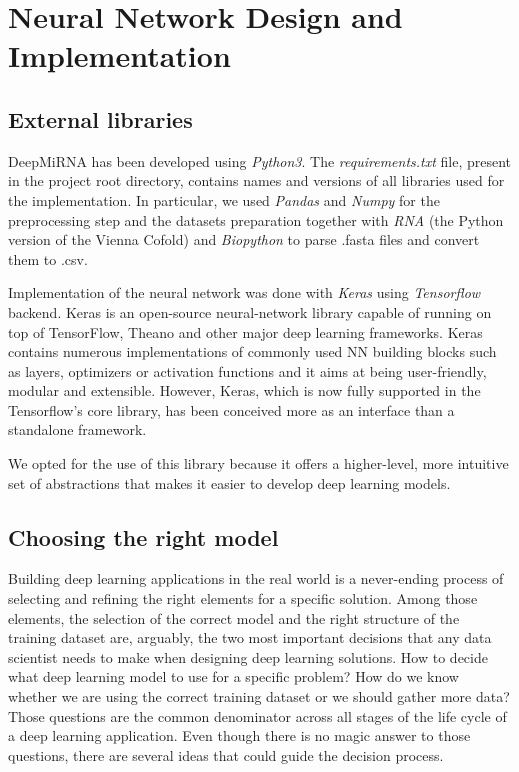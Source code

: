 
\chapter{Neural Network Design and Implementation} %

\label{Chapter5} %

\section{External libraries}
DeepMiRNA has been developed using \emph{Python3}. The \emph{requirements.txt} file, present in the project root directory, contains names and versions of all libraries used for the implementation. In particular, we used \emph{Pandas} and \emph{Numpy} for the preprocessing step and the datasets preparation together with \emph{RNA} (the Python version of the Vienna Cofold) and \emph{Biopython} to parse .fasta files and convert them to .csv. 

Implementation of the neural network was done with \emph{Keras}\cite{keras} using \emph{Tensorflow} backend\cite{tensorflow}. Keras is an open-source neural-network library capable of running on top of TensorFlow, Theano and other major deep learning frameworks. Keras contains numerous implementations of commonly used NN building blocks such as layers, optimizers or activation functions and it aims at being user-friendly, modular and extensible. However, Keras, which is now fully supported in the Tensorflow's core library, has been conceived more as an interface than a standalone framework. 

We opted for the use of this library because it offers a higher-level, more intuitive set of abstractions that makes it easier to develop deep learning models.    

\section{Choosing the right model}
Building deep learning applications in the real world is a never-ending process of selecting and refining the right elements for a specific solution. Among those elements, the selection of the correct model and the right structure of the training dataset are, arguably, the two most important decisions that any data scientist needs to make when designing deep learning solutions. How to decide what deep learning model to use for a specific problem? How do we know whether we are using the correct training dataset or we should gather more data? Those questions are the common denominator across all stages of the life cycle of a deep learning application. Even though there is no magic answer to those questions, there are several ideas that could guide the decision process. 

